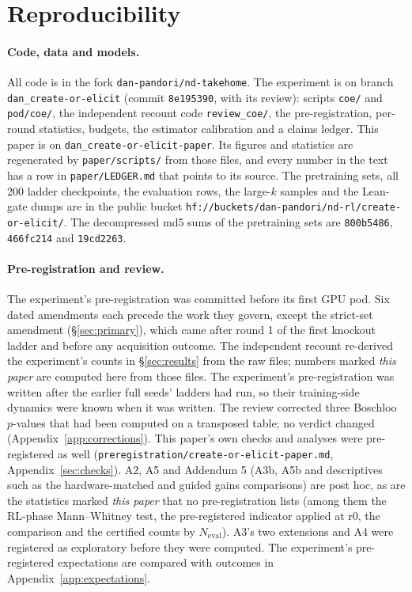 \section{Reproducibility}
\label{sec:repro}

\paragraph{Code, data and models.} All code is in the fork \texttt{dan-pandori/nd-takehome}. The experiment is on branch
\texttt{dan\_create-or-elicit} (commit \texttt{8e195390}, with its review): scripts \texttt{coe/} and \texttt{pod/coe/},
the independent recount code \texttt{review\_coe/}, the pre-registration, per-round statistics, budgets, the estimator
calibration and a claims ledger. This paper is on \texttt{dan\_create-or-elicit-paper}. Its figures and statistics are
regenerated by \texttt{paper/scripts/} from those files, and every number in the text has a row in
\texttt{paper/LEDGER.md} that points to its source. The pretraining sets, all 200 ladder checkpoints, the evaluation rows,
the large-$k$ samples and the Lean-gate dumps are in the public bucket
\texttt{hf://buckets/dan-pandori/nd-rl/create-or-elicit/}. The decompressed md5 sums of the pretraining sets are \KT{}
\texttt{800b5486}, \KTko{} \texttt{466fc214} and \KTdose{} \texttt{19cd2263}.

\paragraph{Pre-registration and review.} The experiment's pre-registration was committed before its first GPU pod. Six
dated amendments each precede the work they govern, except the strict-set amendment (\S\ref{sec:primary}), which came
after round 1 of the first knockout ladder and before any acquisition outcome. The independent recount re-derived the experiment's
counts in \S\ref{sec:results} from the raw files; numbers marked \emph{this paper} are computed here from those files.
The experiment's pre-registration was written after the earlier full seeds' ladders had run, so their training-side
dynamics were known when it was written. The review corrected three Boschloo $p$-values that had been computed on a
transposed table; no verdict changed (Appendix~\ref{app:corrections}). This paper's own checks and analyses were
pre-registered as well (\texttt{preregistration/create-or-elicit-paper.md}, Appendix~\ref{sec:checks}). A2, A5
and Addendum 5 (A3b, A5b and descriptives such as the hardware-matched and guided gains comparisons) are post hoc, as are
the statistics marked \emph{this paper} that no pre-registration lists (among them the RL-phase Mann--Whitney test, the
pre-registered indicator applied at r0, the \dcov{} comparison and the certified counts by $N_{\mathrm{eval}}$). A3's two extensions and A4 were
registered as exploratory before they were computed. The experiment's pre-registered expectations are compared with outcomes in
Appendix~\ref{app:expectations}.

